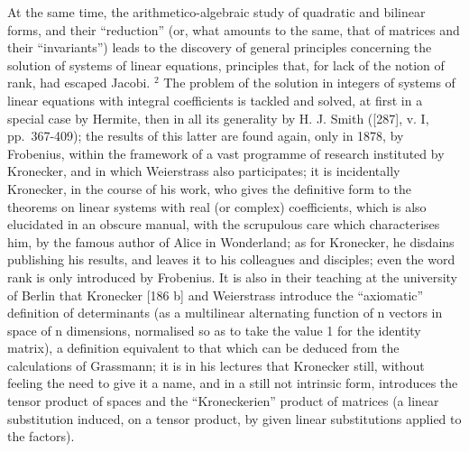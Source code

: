 At the same time, the arithmetico-algebraic study of quadratic and bilinear forms, and their ``reduction'' (or, what amounts to the same, that of matrices and their ``invariants'') leads to the discovery of general principles concerning the solution of systems of linear equations, principles that, for lack of the notion of rank, had escaped Jacobi. \(^{2}\) The problem of the solution in integers of systems of linear equations with integral coefficients is tackled and solved, at first in a special case by Hermite, then in all its generality by H. J. Smith ({[}287{]}, v. I, pp.~367-409); the results of this latter are found again, only in 1878, by Frobenius, within the framework of a vast programme of research instituted by Kronecker, and in which Weierstrass also participates; it is incidentally Kronecker, in the course of his work, who gives the definitive form to the theorems on linear systems with real (or complex) coefficients, which is also elucidated in an obscure manual, with the scrupulous care which characterises him, by the famous author of Alice in Wonderland; as for Kronecker, he disdains publishing his results, and leaves it to his colleagues and disciples; even the word rank is only introduced by Frobenius. It is also in their teaching at the university of Berlin that Kronecker {[}186 b{]} and Weierstrass introduce the ``axiomatic'' definition of determinants (as a multilinear alternating function of n vectors in space of n dimensions, normalised so as to take the value 1 for the identity matrix), a definition equivalent to that which can be deduced from the calculations of Grassmann; it is in his lectures that Kronecker still, without feeling the need to give it a name, and in a still not intrinsic form, introduces the tensor product of spaces and the ``Kroneckerien'' product of matrices (a linear substitution induced, on a tensor product, by given linear substitutions applied to the factors).

